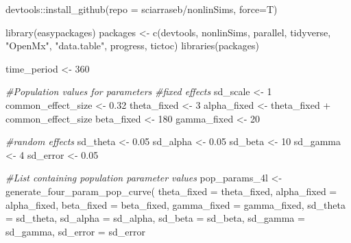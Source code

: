 \documentclass[
12pt, %
twoside,
english]{guelphthesis}
\newenvironment{Shaded}{\begin{snugshade}}{\end{snugshade}}
\newcommand{\AttributeTok}[1]{\textcolor[rgb]{0.77,0.63,0.00}{#1}}
\newcommand{\CommentTok}[1]{\textcolor[rgb]{0.56,0.35,0.01}{\textit{#1}}}
\newcommand{\DecValTok}[1]{\textcolor[rgb]{0.00,0.00,0.81}{#1}}
\newcommand{\FloatTok}[1]{\textcolor[rgb]{0.00,0.00,0.81}{#1}}
\newcommand{\FunctionTok}[1]{\textcolor[rgb]{0.00,0.00,0.00}{#1}}
\newcommand{\NormalTok}[1]{#1}
\newcommand{\OtherTok}[1]{\textcolor[rgb]{0.56,0.35,0.01}{#1}}
\newcommand{\SpecialCharTok}[1]{\textcolor[rgb]{0.00,0.00,0.00}{#1}}
\newcommand{\StringTok}[1]{\textcolor[rgb]{0.31,0.60,0.02}{#1}}
\begin{document}
\restoreparindent\label{sim-code}
\begin{Shaded}
\begin{Highlighting}[numbers=left,,]
\NormalTok{devtools}\SpecialCharTok{::}\FunctionTok{install\_github}\NormalTok{(}\AttributeTok{repo =} \StringTok{\textquotesingle{}sciarraseb/nonlinSims\textquotesingle{}}\NormalTok{, }\AttributeTok{force=}\NormalTok{T)}

\FunctionTok{library}\NormalTok{(easypackages)}
\NormalTok{packages }\OtherTok{\textless{}{-}} \FunctionTok{c}\NormalTok{(}\StringTok{\textquotesingle{}devtools\textquotesingle{}}\NormalTok{, }\StringTok{\textquotesingle{}nonlinSims\textquotesingle{}}\NormalTok{, }\StringTok{\textquotesingle{}parallel\textquotesingle{}}\NormalTok{, }\StringTok{\textquotesingle{}tidyverse\textquotesingle{}}\NormalTok{, }\StringTok{"OpenMx"}\NormalTok{, }\StringTok{"data.table"}\NormalTok{, }\StringTok{\textquotesingle{}progress\textquotesingle{}}\NormalTok{, }\StringTok{\textquotesingle{}tictoc\textquotesingle{}}\NormalTok{)}
\FunctionTok{libraries}\NormalTok{(packages)}

\NormalTok{time\_period }\OtherTok{\textless{}{-}} \DecValTok{360}

\CommentTok{\#Population values for parameters }
\CommentTok{\#fixed effects}
\NormalTok{sd\_scale }\OtherTok{\textless{}{-}} \DecValTok{1}
\NormalTok{common\_effect\_size }\OtherTok{\textless{}{-}} \FloatTok{0.32}
\NormalTok{theta\_fixed }\OtherTok{\textless{}{-}} \DecValTok{3}
\NormalTok{alpha\_fixed }\OtherTok{\textless{}{-}}\NormalTok{ theta\_fixed }\SpecialCharTok{+}\NormalTok{ common\_effect\_size}
\NormalTok{beta\_fixed }\OtherTok{\textless{}{-}} \DecValTok{180}
\NormalTok{gamma\_fixed }\OtherTok{\textless{}{-}} \DecValTok{20}

\CommentTok{\#random effects }
\NormalTok{sd\_theta }\OtherTok{\textless{}{-}} \FloatTok{0.05}
\NormalTok{sd\_alpha }\OtherTok{\textless{}{-}} \FloatTok{0.05}
\NormalTok{sd\_beta }\OtherTok{\textless{}{-}} \DecValTok{10}
\NormalTok{sd\_gamma }\OtherTok{\textless{}{-}} \DecValTok{4}
\NormalTok{sd\_error }\OtherTok{\textless{}{-}} \FloatTok{0.05}

\CommentTok{\#List containing population parameter values}
\NormalTok{pop\_params\_4l }\OtherTok{\textless{}{-}} \FunctionTok{generate\_four\_param\_pop\_curve}\NormalTok{(}
  \AttributeTok{theta\_fixed =}\NormalTok{  theta\_fixed, }\AttributeTok{alpha\_fixed =}\NormalTok{ alpha\_fixed, }
   \AttributeTok{beta\_fixed =}\NormalTok{ beta\_fixed, }\AttributeTok{gamma\_fixed =}\NormalTok{ gamma\_fixed, }
   \AttributeTok{sd\_theta =}\NormalTok{ sd\_theta, }\AttributeTok{sd\_alpha =}\NormalTok{ sd\_alpha, }
   \AttributeTok{sd\_beta =}\NormalTok{ sd\_beta, }\AttributeTok{sd\_gamma =}\NormalTok{ sd\_gamma, }\AttributeTok{sd\_error =}\NormalTok{ sd\_error}




\end{Highlighting}
\end{Shaded}
\end{document}
